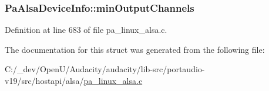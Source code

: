 \subsubsection[{\texorpdfstring{min\+Output\+Channels}{minOutputChannels}}]{ Pa\+Alsa\+Device\+Info\+::min\+Output\+Channels}\hypertarget{struct_pa_alsa_device_info_a2ce67b50d5ac9bfe1ed3210694e580ab}{}\label{struct_pa_alsa_device_info_a2ce67b50d5ac9bfe1ed3210694e580ab}


Definition at line 683 of file pa\+\_\+linux\+\_\+alsa.\+c.



The documentation for this struct was generated from the following file\+:\begin{DoxyCompactItemize}
\item 
C\+:/\+\_\+dev/\+Open\+U/\+Audacity/audacity/lib-\/src/portaudio-\/v19/src/hostapi/alsa/\hyperlink{pa__linux__alsa_8c}{pa\+\_\+linux\+\_\+alsa.\+c}\end{DoxyCompactItemize}
